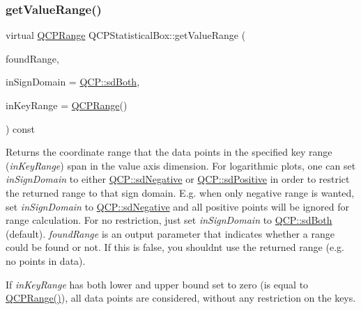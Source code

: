 \subsubsection{\texorpdfstring{get\+Value\+Range()}{getValueRange()}\hspace{0.1cm}{\footnotesize\ttfamily [2/2]}}
{\footnotesize\ttfamily virtual \hyperlink{class_q_c_p_range}{Q\+C\+P\+Range} Q\+C\+P\+Statistical\+Box\+::get\+Value\+Range (\begin{DoxyParamCaption}\item[{bool \&}]{found\+Range,  }\item[{\hyperlink{namespace_q_c_p_afd50e7cf431af385614987d8553ff8a9}{Q\+C\+P\+::\+Sign\+Domain}}]{in\+Sign\+Domain = {\ttfamily \hyperlink{namespace_q_c_p_afd50e7cf431af385614987d8553ff8a9a3dee7e9cd2fedce9253b83e172626a6c}{Q\+C\+P\+::sd\+Both}},  }\item[{const \hyperlink{class_q_c_p_range}{Q\+C\+P\+Range} \&}]{in\+Key\+Range = {\ttfamily \hyperlink{class_q_c_p_range}{Q\+C\+P\+Range}()} }\end{DoxyParamCaption}) const\hspace{0.3cm}{\ttfamily [virtual]}}

Returns the coordinate range that the data points in the specified key range ({\itshape in\+Key\+Range}) span in the value axis dimension. For logarithmic plots, one can set {\itshape in\+Sign\+Domain} to either \hyperlink{namespace_q_c_p_afd50e7cf431af385614987d8553ff8a9a0b464fa3135be2808909739a969193c9}{Q\+C\+P\+::sd\+Negative} or \hyperlink{namespace_q_c_p_afd50e7cf431af385614987d8553ff8a9a23362334a52289677a51526a9b68db6c}{Q\+C\+P\+::sd\+Positive} in order to restrict the returned range to that sign domain. E.\+g. when only negative range is wanted, set {\itshape in\+Sign\+Domain} to \hyperlink{namespace_q_c_p_afd50e7cf431af385614987d8553ff8a9a0b464fa3135be2808909739a969193c9}{Q\+C\+P\+::sd\+Negative} and all positive points will be ignored for range calculation. For no restriction, just set {\itshape in\+Sign\+Domain} to \hyperlink{namespace_q_c_p_afd50e7cf431af385614987d8553ff8a9a3dee7e9cd2fedce9253b83e172626a6c}{Q\+C\+P\+::sd\+Both} (default). {\itshape found\+Range} is an output parameter that indicates whether a range could be found or not. If this is false, you shouldn\textquotesingle{}t use the returned range (e.\+g. no points in data).

If {\itshape in\+Key\+Range} has both lower and upper bound set to zero (is equal to {\ttfamily \hyperlink{class_q_c_p_range}{Q\+C\+P\+Range()}}), all data points are considered, without any restriction on the keys.

